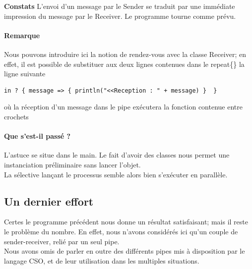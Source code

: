 \documentclass[a4paper,11pt,french]{report}
\begin{document}
\bigskip

\textbf{Constats} L'envoi d'un message par le \textsf{Sender} se traduit par une immédiate impression du message par le \textsf{Receiver}. Le programme tourne comme prévu.

\paragraph{Remarque} Nous pouvons introduire ici la notion de rendez-vous avec la classe Receiver; en effet, il est possible de substituer aux deux lignes contenues dans le \textsf{repeat\{\}} la ligne suivante
\begin{center}
\begin{verbatim}
in ? { message => { println("<<Reception : " + message) }  }
\end{verbatim}
\end{center}
où la réception d'un message dans le pipe exécutera la fonction contenue entre crochets


\paragraph{Que s'est-il passé ?} L'astuce se situe dans le \textsf{main}. Le fait d'avoir des classes nous permet une instanciation préliminaire sans lancer l'objet.\\
La sélective lançant le processus semble alors bien s'exécuter en parallèle.\\

\subsection{Un dernier effort}
Certes le programme précédent nous donne un résultat satisfaisant; mais il reste le problème du nombre. En effet, nous n'avons considérés ici qu'un couple de sender-receiver, relié par un seul pipe.\\
Nous avons omis de parler en outre des différents pipes mis à disposition par le langage CSO, et de leur utilisation dans les multiples situations.
\end{document}
